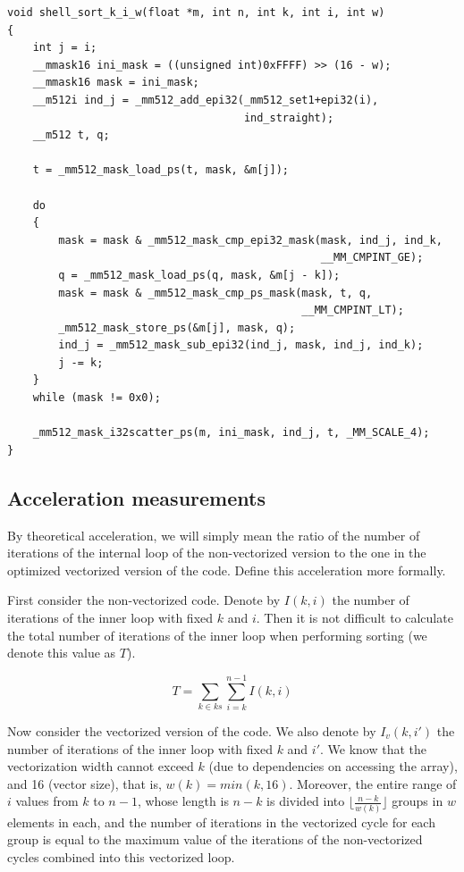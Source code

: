 \documentclass[
11pt,%
tightenlines,%
twoside,%
onecolumn,%
nofloats,%
nobibnotes,%
nofootinbib,%
superscriptaddress,%
noshowpacs,%
centertags]%
{revtex4}
\begin{document}
\begin{lstlisting}[caption={Vectorized version of Shell sorting kernel.},label={lst:vectcode}]
void shell_sort_k_i_w(float *m, int n, int k, int i, int w)
{
    int j = i;
    __mmask16 ini_mask = ((unsigned int)0xFFFF) >> (16 - w);
    __mmask16 mask = ini_mask;
    __m512i ind_j = _mm512_add_epi32(_mm512_set1+epi32(i),
                                     ind_straight);
    __m512 t, q;
    
    t = _mm512_mask_load_ps(t, mask, &m[j]);

    do
    {
        mask = mask & _mm512_mask_cmp_epi32_mask(mask, ind_j, ind_k,
                                                 __MM_CMPINT_GE);
        q = _mm512_mask_load_ps(q, mask, &m[j - k]);
        mask = mask & _mm512_mask_cmp_ps_mask(mask, t, q,
                                              __MM_CMPINT_LT);
        _mm512_mask_store_ps(&m[j], mask, q);
        ind_j = _mm512_mask_sub_epi32(ind_j, mask, ind_j, ind_k);
        j -= k;
    }
    while (mask != 0x0);
    
    _mm512_mask_i32scatter_ps(m, ini_mask, ind_j, t, _MM_SCALE_4);
}
\end{lstlisting}

\subsection{Acceleration measurements}

By theoretical acceleration, we will simply mean the ratio of the number of iterations of the internal loop of the non-vectorized version to the one in the optimized vectorized version of the code.
Define this acceleration more formally.

First consider the non-vectorized code.
Denote by $ I (k, i) $ the number of iterations of the inner loop with fixed $ k $ and $ i $.
Then it is not difficult to calculate the total number of iterations of the inner loop when performing sorting (we denote this value as $T$).

\begin{equation}
T = \sum_{k \in ks}{\sum_{i = k}^{n - 1}{I(k, i)}}
\end{equation}

Now consider the vectorized version of the code. We also denote by $ I_v (k, i') $ the number of iterations of the inner loop with fixed $ k $ and $ i' $.
We know that the vectorization width cannot exceed $ k $ (due to dependencies on accessing the array), and 16 (vector size), that is, $ w (k) = min (k, 16) $.
Moreover, the entire range of $ i $ values from $ k $ to $ n - 1 $, whose length is $ n - k $ is divided into $ \lfloor \frac {n - k} {w (k)} \rfloor $ groups in $ w $ elements in each, and the number of iterations in the vectorized cycle for each group is equal to the maximum value of the iterations of the non-vectorized cycles combined into this vectorized loop.
\end{document}
